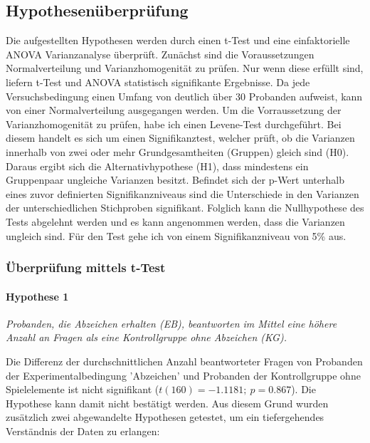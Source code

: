 \subsection{Hypothesenüberprüfung}\label{hypo}
Die aufgestellten Hypothesen werden durch einen t-Test und eine einfaktorielle  ANOVA  Varianzanalyse überprüft. Zunächst sind die Voraussetzungen Normalverteilung und Varianzhomogenität zu prüfen. Nur wenn diese erfüllt sind, liefern t-Test und ANOVA statistisch signifikante Ergebnisse. Da jede Versuchsbedingung einen Umfang von deutlich über 30 Probanden aufweist, kann von einer Normalverteilung ausgegangen werden. Um die Vorraussetzung der Varianzhomogenität zu prüfen, habe ich einen Levene-Test durchgeführt. Bei diesem handelt es sich um einen Signifikanztest, welcher prüft, ob die Varianzen innerhalb von zwei oder mehr Grundgesamtheiten (Gruppen) gleich sind (H0). Daraus ergibt sich die Alternativhypothese (H1), dass mindestens ein Gruppenpaar ungleiche Varianzen besitzt. Befindet sich der p-Wert unterhalb  eines zuvor definierten Signifikanzniveaus sind die Unterschiede in den Varianzen der unterschiedlichen Stichproben signifikant. Folglich kann die Nullhypothese des Tests abgelehnt werden und es kann angenommen werden, dass die Varianzen ungleich sind. Für den Test gehe ich von einem Signifikanzniveau von 5\% aus. 

\subsubsection{Überprüfung mittels t-Test}

\paragraph{Hypothese 1 }
\begin{center}
    \textit{Probanden, die Abzeichen erhalten (EB), beantworten im Mittel eine höhere Anzahl an Fragen als eine Kontrollgruppe ohne Abzeichen (KG).} 
\end{center}


Die Differenz der durchschnittlichen Anzahl beantworteter Fragen von Probanden der Experimentalbedingung 'Abzeichen' und Probanden der Kontrollgruppe ohne Spielelemente ist nicht signifikant ($t (160) = -1.1181;\: p = 0.867$). Die Hypothese kann damit nicht bestätigt werden. Aus diesem Grund wurden zusätzlich zwei abgewandelte Hypothesen getestet, um ein tiefergehendes Verständnis der Daten zu erlangen:

